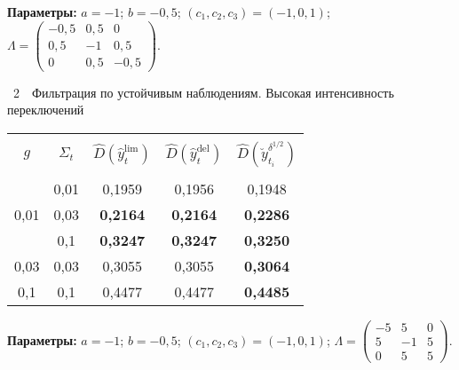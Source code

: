 \begin{multicols}{2}
\begin{center}
{\smallskip

\parbox{78mm}{\footnotesize{\hspace*{5mm}\textbf{Параметры:} $a=-1$; $b=-0{,}5$; $(c_1,c_2,c_3)=(-1, 0, 1)$; $\Lambda= 
\begin{pmatrix}
-0{,}5& 0{,}5& 0\\
0{,}5& -1& 0{,}5\\
0& 0{,}5& -0{,}5
\end{pmatrix}$.
}}
}
\end{center}

\begin{center}
\parbox{78mm}{{\tablename~2}\ \ \small{Фильтрация по устойчивым наблюдениям. Высокая ин\-тен\-сив\-ность 
переключений
}}


      \vspace*{6pt}
      
     {\small  
     \tabcolsep=8pt
     \begin{tabular}{|c|c|c|c|c|}
      \hline
&&&&\\[-9pt]
$g$ &$\Sigma_t$&$\hat{D}\left(\hat{y}_t^{\mathrm{lim}}\right)$ & $\hat{D}\left(\hat{y}_t^{\mathrm{del}}\right)$ &$\hat{D}\left(\breve{y}_{t_i}^{\delta^{1/2}}\right)$\\
&&&&\\[-9pt]
\hline
 & 0{,}01&0,1959&0,1956&0,1948\\
0{,}01 & 0{,}03&\textbf{0,2164}&\textbf{0,2164}&\textbf{0,2286}\\
&  0{,}1\hphantom{9}&\textbf{0,3247}&\textbf{0,3247}&\textbf{0,3250}\\
\hline
0{,}03 &  0{,}03&0,3055&0,3055&\textbf{0,3064}\\
\hline
0{,}1\hphantom{9} &  0{,}1\hphantom{9}&0,4477&0,4477&\textbf{0,4485}\\
\hline
\end{tabular}
\smallskip

\parbox{78mm}{\footnotesize{\hspace*{5mm}\textbf{Параметры:} $a=-1$; $b=-0{,}5$; $(c_1, c_2, c_3)=(-1,0,1)$; $\Lambda = 
\begin{pmatrix}
-5& 5&0\\
5 &-1 &5\\
0&5&5
\end{pmatrix}$.
}}
}


\end{center}
\end{multicols}
